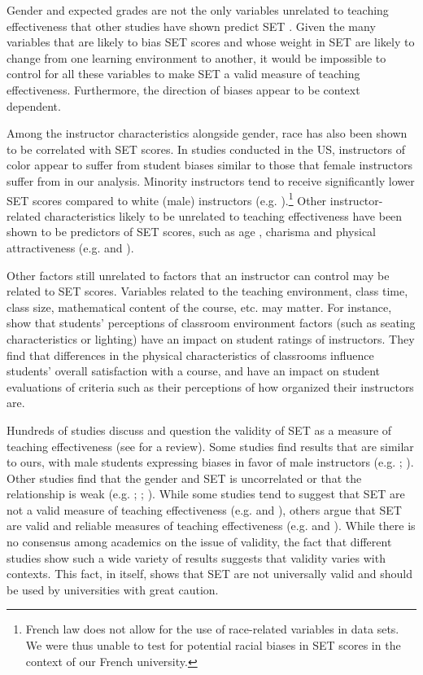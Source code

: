 \documentclass[12pt]{article}
\begin{document}
Gender and expected grades are not the only variables unrelated to teaching effectiveness that other studies have shown predict SET \citep{ADD_CITATIONS}.
Given the many variables that are likely to bias SET scores and whose weight in SET are likely to change from one learning environment to another, it would be impossible to control for all these variables to make SET a valid measure of teaching effectiveness. Furthermore, the direction of biases appear to be context dependent. 

Among the instructor characteristics alongside gender, race has also been shown to be correlated with SET scores.  In studies conducted in the US, instructors of color appear to suffer from student biases similar to those that female instructors suffer from in our analysis. Minority instructors tend to receive significantly lower SET scores compared to white (male) instructors (e.g. \citet{Merritt2008}).\footnote{French law does not allow for the use of race-related variables in data sets. We were thus unable to test for potential racial biases in SET scores in the context of our French university.} Other instructor-related characteristics likely to be unrelated to teaching effectiveness have been shown to be predictors of SET scores, such as age \citep{Arbuckle2003}, charisma \citep{Shevlin2000} and physical attractiveness (e.g. \citet{Riniolo2006} and \citet{Hamermesh2005}).  

Other factors still unrelated to factors that an instructor can control may be related to SET scores.  
Variables related to the teaching environment, class time, class size, mathematical content of the course, etc. may matter. 
For instance, \citet{Hill2010} show that students' perceptions of classroom environment factors (such as seating characteristics or lighting) have an impact on student ratings of instructors. 
They find that differences in the physical characteristics of classrooms influence students' overall satisfaction with a course, and have an impact on student evaluations of criteria such as their perceptions of how organized their instructors are.

Hundreds of studies discuss and question the validity of SET as a measure of teaching effectiveness 
(see \citet{Pounder2007} for a review). 
Some studies find results that are similar to ours, with male students expressing biases in favor of male instructors (e.g. \citet{Basow1987}; \citet{Kaschak1978}). 
Other studies find that the gender and SET is uncorrelated or that the relationship is weak (e.g. \citet{Bennett1982}; \citet{Centra2000}; \citet{Elmore1974}). 
While some studies tend to suggest that SET are not a valid measure of teaching effectiveness (e.g. \citet{Galbraith2012} and \citet{Carrell2010a}), others argue that SET are valid and reliable measures of teaching effectiveness (e.g. \citet{Benton2012} and \citet{Centra1977}). 
While there is no consensus among academics on the issue of validity, the fact that different 
studies show such a wide variety of results suggests that validity varies with contexts. 
This fact, in itself, shows that SET are not universally valid and should be used by universities with great caution.  
\end{document}
